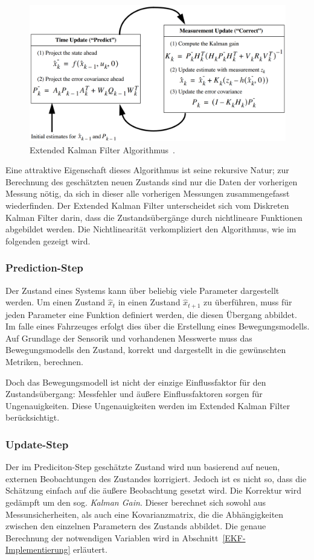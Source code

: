 \documentclass[11pt]{scrartcl}
\begin{document}
\begin{figure}[!t]
	\centering
	\includegraphics[width=5in]{EKF_algorithm.png}
	\caption{Extended Kalman Filter Algorithmus~\cite{EKF_course}.}
	\label{EKF-Algorithmus}
\end{figure}

Eine attraktive Eigenschaft dieses Algorithmus ist seine rekursive Natur; zur Berechnung des geschätzten neuen Zustands sind nur die Daten der vorherigen Messung nötig, da sich  in dieser alle vorherigen Messungen zusammengefasst wiederfinden. Der Extended Kalman Filter unterscheidet sich vom Diskreten Kalman Filter darin, dass die Zustandsübergänge durch nichtlineare Funktionen abgebildet werden. Die Nichtlinearität verkompliziert den Algorithmus, wie im folgenden gezeigt wird.

\subsubsection{Prediction-Step}
Der Zustand eines Systems kann über beliebig viele Parameter dargestellt werden. Um einen Zustand $\hat{x}_t$ in einen Zustand $\hat{x}_{t+1}$ zu überführen, muss für jeden Parameter eine Funktion definiert werden, die diesen Übergang abbildet. Im falle eines Fahrzeuges erfolgt dies über die Erstellung eines Bewegungsmodells. Auf Grundlage der Sensorik und vorhandenen Messwerte muss das Bewegungsmodells den Zustand, korrekt und dargestellt in die gewünschten Metriken, berechnen.

Doch das Bewegungsmodell ist nicht der einzige Einflussfaktor für den Zustandsübergang: Messfehler und äußere Einflussfaktoren sorgen für Ungenauigkeiten. Diese Ungenauigkeiten werden im Extended Kalman Filter berücksichtigt.

\subsubsection{Update-Step}
Der im Prediciton-Step geschätzte Zustand wird nun basierend auf neuen, externen Beobachtungen des Zustandes korrigiert. Jedoch ist es nicht so, dass die Schätzung einfach auf die äußere Beobachtung gesetzt wird. Die Korrektur wird gedämpft um den sog. \textit{Kalman Gain}. Dieser berechnet sich sowohl aus Messunsicherheiten, als auch eine Kovarianzmatrix, die die Abhängigkeiten zwischen den einzelnen Parametern des Zustands abbildet. Die genaue Berechnung der notwendigen Variablen wird in Abschnitt~\ref{EKF-Implementierung} erläutert.
\end{document}

